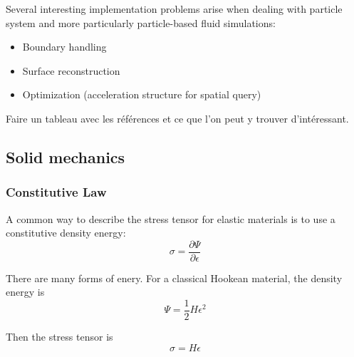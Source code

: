 \documentclass[11pt, oneside, a4paper]{memoir}
\begin{document}
Several interesting implementation problems arise when dealing with particle system and more particularly particle-based fluid simulations:

\begin{itemize}
\item Boundary handling 
\item Surface reconstruction
\item Optimization (acceleration structure for spatial query)
\end{itemize}

Faire un tableau avec les références et ce que l'on peut y trouver d'intéressant.


\subsection{Solid mechanics}

\subsubsection{Constitutive Law}
A common way to describe the stress tensor for elastic materials is to use a constitutive density energy:
\begin{equation}
\sigma = \frac{\partial \Psi}{\partial \epsilon}
\end{equation}

There are many forms of enery. For a classical Hookean material, the density energy is
\begin{equation}
\Psi = \frac{1}{2}H\epsilon^{2}
\end{equation}

Then the stress tensor is
\begin{equation}
\sigma = H\epsilon
\end{equation}
\end{document}
